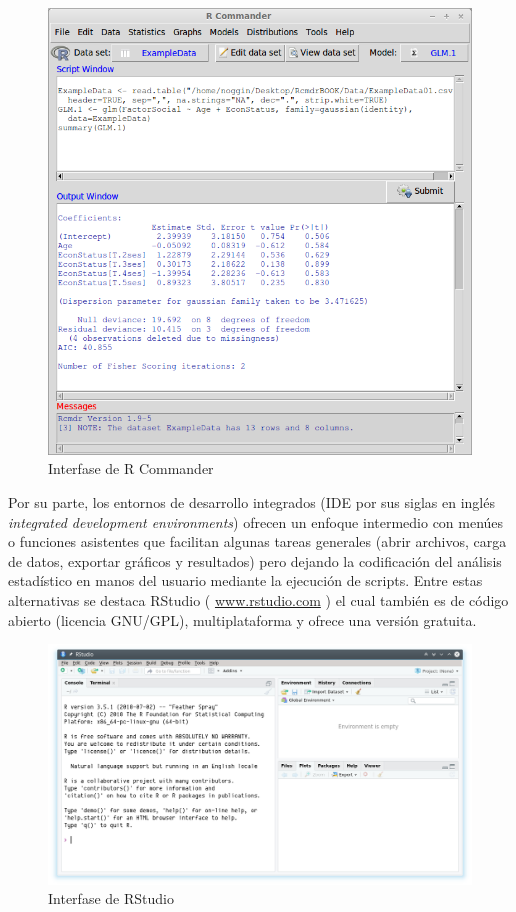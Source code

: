 \documentclass[a4paper]{book}
\begin{document}
\begin{figure}[h]

{\centering \includegraphics[width=0.75\linewidth,]{images/RcmdrBASE} 

}

\caption{Interfase de R Commander}\label{fig:unnamed-chunk-4}
\end{figure}

Por su parte, los entornos de desarrollo integrados (IDE por sus siglas
en inglés \emph{integrated development environments}) ofrecen un enfoque
intermedio con menúes o funciones asistentes que facilitan algunas
tareas generales (abrir archivos, carga de datos, exportar gráficos y
resultados) pero dejando la codificación del análisis estadístico en
manos del usuario mediante la ejecución de scripts. Entre estas
alternativas se destaca RStudio ( \url{www.rstudio.com} ) el cual
también es de código abierto (licencia GNU/GPL), multiplataforma y
ofrece una versión gratuita.

\begin{figure}[h]

{\centering \includegraphics[width=0.75\linewidth,]{images/RStudio} 

}

\caption{Interfase de RStudio}\label{fig:unnamed-chunk-5}
\end{figure}
\end{document}
